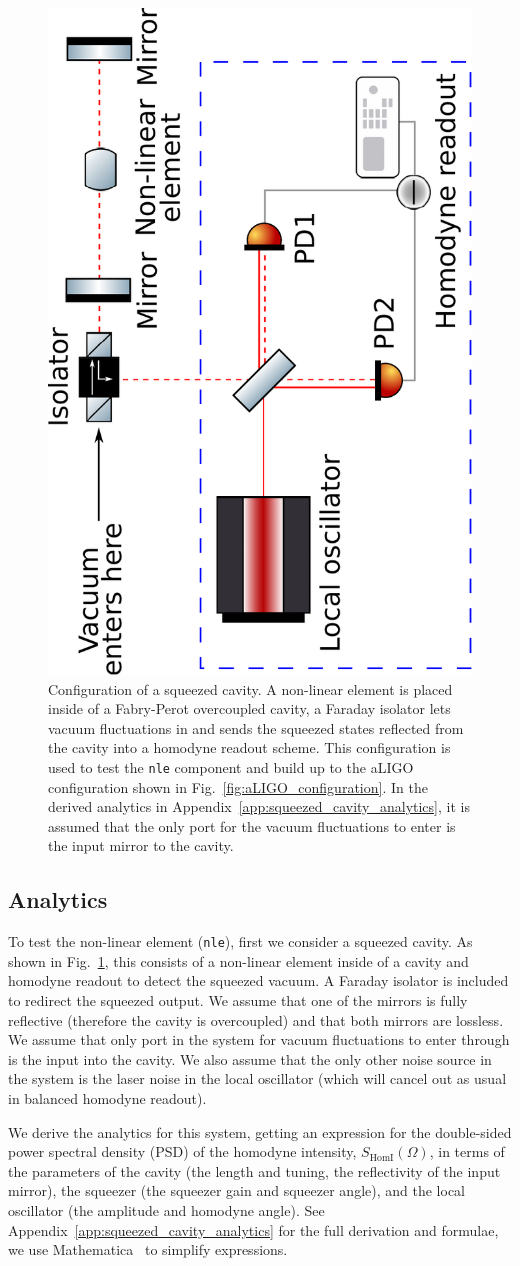 \documentclass[aps,pra,superscriptaddress,reprint,nofootinbib]{revtex4-1}
\newcommand{\code}[1]{\texttt{#1}}
\begin{document}
\begin{figure}[ht!]
	\begin{center}
	\includegraphics[height=0.45\textwidth, angle=-90]{figures/squeezed_cavity.pdf}
	\end{center}
	\caption{Configuration of a squeezed cavity. A non-linear element is placed inside of a Fabry-Perot overcoupled cavity, a Faraday isolator lets vacuum fluctuations in and sends the squeezed states reflected from the cavity into a homodyne readout scheme. This configuration is used to test the \code{nle} component and build up to the aLIGO configuration shown in Fig.~\ref{fig:aLIGO_configuration}. In the derived analytics in Appendix~\ref{app:squeezed_cavity_analytics}, it is assumed that the only port for the vacuum fluctuations to enter is the input mirror to the cavity.}
	\label{fig:squeezed_cavity}
\end{figure}

\subsection{Analytics}

To test the non-linear element (\code{nle}), first we consider a squeezed cavity. As shown in Fig.~\ref{fig:squeezed_cavity}, this consists of a non-linear element inside of a cavity and homodyne readout to detect the squeezed vacuum. A Faraday isolator is included to redirect the squeezed output. We assume that one of the mirrors is fully reflective (therefore the cavity is overcoupled) and that both mirrors are lossless. We assume that only port in the system for vacuum fluctuations to enter through is the input into the cavity. We also assume that the only other noise source in the system is the laser noise in the local oscillator (which will cancel out as usual in balanced homodyne readout).

We derive the analytics for this system, getting an expression for the double-sided power spectral density (PSD) of the homodyne intensity, $S_{\mathrm{HomI}}(\Omega)$, in terms of the parameters of the cavity (the length and tuning, the reflectivity of the input mirror), the squeezer (the squeezer gain and squeezer angle), and the local oscillator (the amplitude and homodyne angle). See Appendix~\ref{app:squeezed_cavity_analytics} for the full derivation and formulae, we use Mathematica~\cite{mathematica} to simplify expressions.
\end{document}
